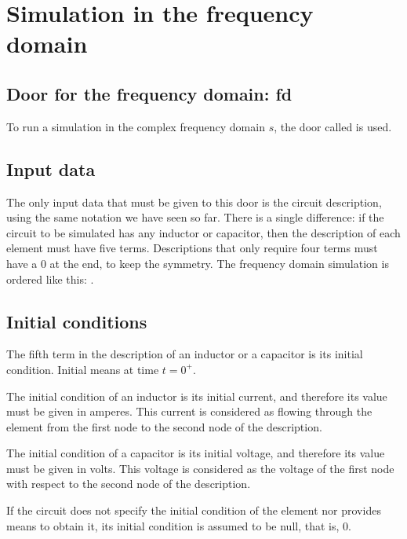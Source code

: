 
\chapter{Simulation in the frequency domain}

\section{Door for the frequency domain: fd}

To run a simulation in the complex frequency domain $s$, the door
called  is used.

\section{Input data}

The only input data that must be given to this door is the circuit
description, using the same notation we have seen so far. There is a
single difference: if the circuit to be simulated has any inductor
or capacitor, then the description of each element must have five
terms. Descriptions that only require four terms must have a 0 at
the end, to keep the symmetry. The frequency domain simulation is
ordered like this: .

\section{Initial conditions}

The fifth term in the description of an inductor or a capacitor is
its initial condition. Initial means at time $t = 0^{+}$.

The initial condition of an inductor is its initial current, and
therefore its value must be given in amperes. This current is
considered as flowing through the element from the first node to the
second node of the description.

The initial condition of a capacitor is its initial voltage, and
therefore its value must be given in volts. This voltage is
considered as the voltage of the first node with respect to the
second node of the description.

If the circuit does not specify the initial condition of the element
nor provides means to obtain it, its initial condition is assumed to
be null, that is, 0.

